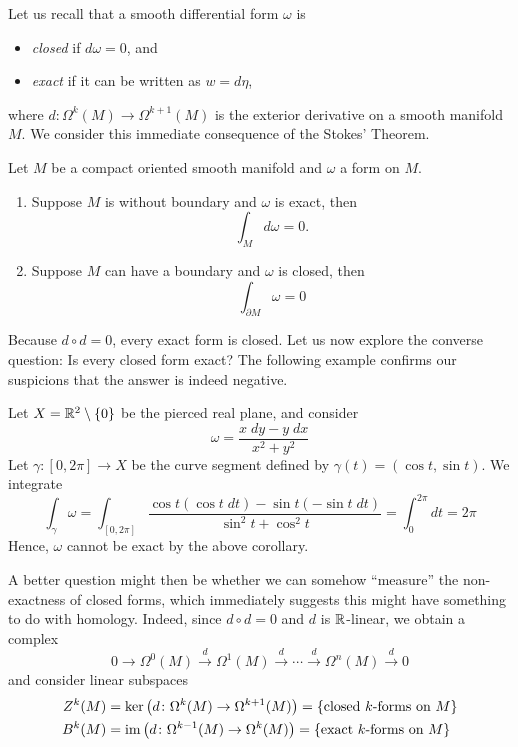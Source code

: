 \documentclass[a4paper, 12pt]{article}
\begin{document}
Let us recall that a smooth differential form $\omega$ is
\begin{itemize}
    \item \emph{closed} if $d\omega = 0$, and
    \item \emph{exact} if it can be written as $w = d\eta$,
\end{itemize}
where $d \colon \Omega^k(M) \to \Omega^{k+1}(M)$ is the exterior derivative on a smooth manifold $M$.
We consider this immediate consequence of the Stokes' Theorem.
\begin{corollary}
    Let $M$ be a compact oriented smooth manifold and $\omega$ a form on $M$.
    \begin{enumerate}[label=(\alph*)]
        \item Suppose $M$ is without boundary and $\omega$ is exact,
            then
            \[
                \int_{M} d\omega = 0.
            \]
        \item Suppose $M$ can have a boundary and $\omega$ is closed,
            then
            \[
                \int_{\partial M} \omega = 0
            \]
    \end{enumerate}
\end{corollary}
Because $d \circ d = 0$, every exact form is closed.
Let us now explore the converse question: Is every closed form exact?
The following example confirms our suspicions that the answer is indeed negative.
\begin{example}
    \label{exa:piercedplane}
    Let $X = \mathbb{R}^2\setminus\lbrace 0 \rbrace$ be the pierced real plane, and consider
    \[
        \omega = \frac{x\; dy - y\; dx}{x^2 + y^2}
    \]
    Let $\gamma \colon [0,2\pi] \to X$ be the curve segment defined by $\gamma(t) = (\cos t, \sin t)$.
    We integrate
    \[
        \int_{\gamma}\omega
        = \int_{[0,2\pi]} \frac{\cos t(\cos t \; dt) - \sin t(-\sin t \; dt)}{\sin^2t + \cos^2t}
        = \int_{0}^{2\pi}dt
        = 2\pi
    \]
    Hence, $\omega$ cannot be exact by the above corollary.
\end{example}
A better question might then be whether we can somehow ``measure'' the non-exactness of closed forms,
which immediately suggests this might have something to do with homology.
Indeed, since $d \circ d = 0$ and $d$ is $\mathbb{R}$-linear, we obtain a complex
\[
    0 \xrightarrow{} \Omega^0(M) \xrightarrow{d} \Omega^1(M) \xrightarrow{d} \cdots \xrightarrow{d} \Omega^n(M) \xrightarrow{d} 0
\]
and consider linear subspaces
\begin{align*}
    Z^k(M) &= \ker\left( d \colon \Omega^k(M) \to \Omega^{k+1}(M) \right) = \left\{ \text{closed $k$-forms on $M$} \right\} \\
    B^k(M) &= \operatorname{im}\left( d \colon \Omega^{k-1}(M) \to \Omega^k(M) \right) = \left\{ \text{exact $k$-forms on $M$} \right\} \\
\end{align*}
\end{document}
